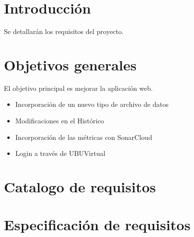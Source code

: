 
\section{Introducción}
Se detallarán los requisitos del proyecto.

\section{Objetivos generales}
El objetivo principal es mejorar la aplicación web.
\begin{itemize}
	\item Incorporación de un nuevo tipo de archivo de datos
	\item Modificaciones en el Histórico
	\item Incorporación de las métricas con SonarCloud
	\item Login a través de UBUVirtual
\end{itemize}

\section{Catalogo de requisitos}

\section{Especificación de requisitos}


